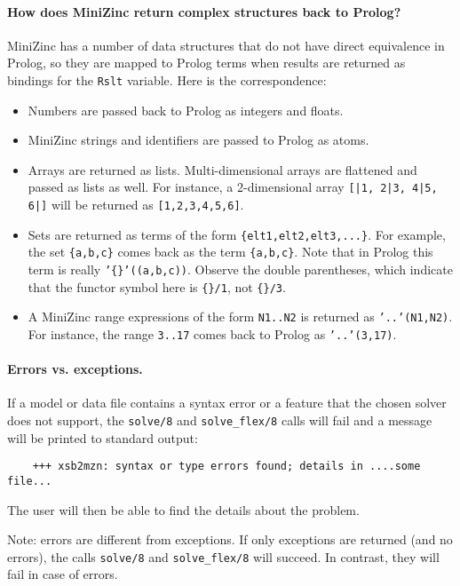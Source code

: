 \paragraph{How does MiniZinc return complex structures back to Prolog?}
MiniZinc has a number of data structures that do not have direct
equivalence in Prolog, so they are mapped to Prolog terms when results are
returned as bindings for the \texttt{Rslt} variable. Here is the correspondence:
\begin{itemize}
\item  Numbers are passed back to Prolog as integers and floats.
\item  MiniZinc strings and identifiers are passed to Prolog as atoms.
\item  Arrays are returned as lists. Multi-dimensional arrays are flattened
  and passed as lists as well. For instance, a 2-dimensional array
  \texttt{[|1, 2|3, 4|5, 6|]} will be returned as \texttt{[1,2,3,4,5,6]}.
\item Sets are returned as terms of the form \texttt{\{elt1,elt2,elt3,...\}}. 
  For example, the set \texttt{\{a,b,c\}} comes back as the term
  \texttt{\{a,b,c\}}. Note that in Prolog this term is really
  \texttt{'\{\}'((a,b,c))}. Observe the double parentheses, which indicate
  that the functor symbol here is \texttt{\{\}/1}, not \texttt{\{\}/3}.
\item A MiniZinc range expressions of the form \texttt{N1..N2} is returned as
  \texttt{'..'(N1,N2)}. For instance, the range \texttt{3..17} 
  comes back to Prolog as \texttt{'..'(3,17)}. 
\end{itemize}

\paragraph{Errors vs. exceptions.}
If a model or data file contains a syntax error or a feature that the
chosen solver does not support, the \texttt{solve/8} and
\texttt{solve\_flex/8} calls will fail and a message will be printed to
standard output:
\begin{verbatim}
    +++ xsb2mzn: syntax or type errors found; details in ....some file...
\end{verbatim}
The user will then be able to find the details about the problem.

Note: errors are different from exceptions. If only exceptions are returned
(and no errors), the calls \texttt{solve/8} and \texttt{solve\_flex/8} will
succeed. In contrast, they will fail in case of errors.

